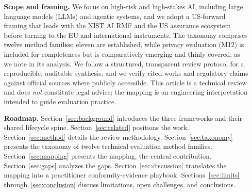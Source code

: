 \textbf{Scope and framing.} We focus on high-risk and high-stakes AI, including large
language models (LLMs) and agentic systems, and we adopt a US-forward framing that leads
with the NIST AI RMF and the US assurance ecosystem before turning to the EU and
international instruments. The taxonomy comprises twelve method families; eleven are
established, while privacy evaluation (M12) is included for completeness but is comparatively
emerging and thinly covered, as we note in its analysis. We follow a structured, transparent review protocol for a reproducible,
auditable synthesis, and we verify cited works and regulatory claims against official
sources where publicly accessible. This article is a technical review and does \emph{not} constitute legal
advice; the mapping is an engineering interpretation intended to guide evaluation
practice.

\textbf{Roadmap.} Section~\ref{sec:background} introduces the three frameworks and their
shared lifecycle spine. Section~\ref{sec:related} positions the work.
Section~\ref{sec:method} details the review methodology. Section~\ref{sec:taxonomy}
presents the taxonomy of twelve technical evaluation method families.
Section~\ref{sec:mapping} presents the mapping, the central contribution.
Section~\ref{sec:gaps} analyzes the gaps. Section~\ref{sec:discussion} translates the
mapping into a practitioner conformity-evidence playbook. Sections~\ref{sec:limits}
through~\ref{sec:conclusion} discuss limitations, open challenges, and conclusions.

